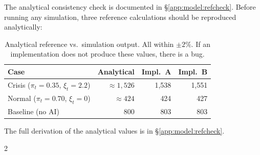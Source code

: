 \documentclass[11pt,a4paper]{article}
\begin{document}
\begin{appendices}
The analytical consistency check is documented in
\S\ref{app:model:refcheck}. Before running any simulation, three reference
calculations should be reproduced analytically:

\begin{table}[H]
\centering\small
\setlength{\tabcolsep}{8pt}
\renewcommand{\arraystretch}{1.20}
\begin{tabular}{@{}l r r r@{}}
\toprule
\textbf{Case} & \textbf{Analytical} & \textbf{Impl.~A} & \textbf{Impl.~B} \\
\midrule
Crisis ($\pi_t{=}0.35$, $\xi_t{=}2.2$) & $\approx 1{,}526$ & 1,538 & 1,551 \\
Normal ($\pi_t{=}0.70$, $\xi_t{=}0$)   & $\approx 424$     & 424   & 427   \\
Baseline (no AI)                        & $800$              & 803   & 803   \\
\bottomrule
\end{tabular}
\caption{Analytical reference vs.\ simulation output. All within $\pm 2\%$.
If an implementation does not produce these values, there is a bug.}
\label{tab:refcheck}
\end{table}

The full derivation of the analytical values is in
\S\ref{app:model:refcheck}.

\end{appendices}

\clearpage
{}
\setlength{\bibsep}{1pt plus 0.3ex}

\begin{multicols}{2}
{\scriptsize

}
\end{multicols}
\restoregeometry
\end{document}
